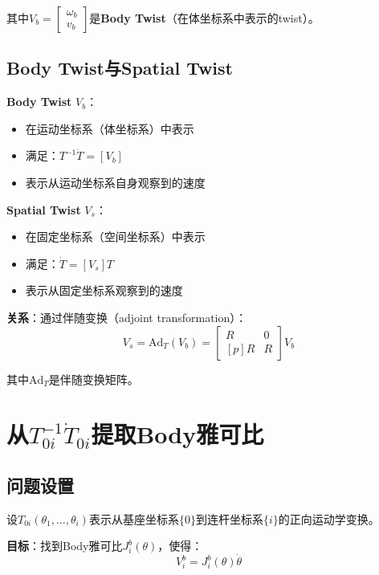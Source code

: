 \documentclass[12pt,a4paper]{article}
\begin{document}
其中$V_b = \begin{bmatrix} \omega_b \\ v_b \end{bmatrix}$是\textbf{Body Twist}（在体坐标系中表示的twist）。

\subsection{Body Twist与Spatial Twist}

\textbf{Body Twist} $V_b$：
\begin{itemize}
\item 在运动坐标系（体坐标系）中表示
\item 满足：$T^{-1} \dot{T} = [V_b]$
\item 表示从运动坐标系自身观察到的速度
\end{itemize}

\textbf{Spatial Twist} $V_s$：
\begin{itemize}
\item 在固定坐标系（空间坐标系）中表示
\item 满足：$\dot{T} = [V_s] T$
\item 表示从固定坐标系观察到的速度
\end{itemize}

\textbf{关系}：通过伴随变换（adjoint transformation）：
\begin{equation}
V_s = \text{Ad}_T(V_b) = \begin{bmatrix} R & 0 \\ [p]R & R \end{bmatrix} V_b
\end{equation}

其中$\text{Ad}_T$是伴随变换矩阵。

\section{从$T_{0i}^{-1}\dot{T}_{0i}$提取Body雅可比}

\subsection{问题设置}

设$T_{0i}(\theta_1, \ldots, \theta_i)$表示从基座坐标系$\{0\}$到连杆坐标系$\{i\}$的正向运动学变换。

\textbf{目标}：找到Body雅可比$J_i^b(\theta)$，使得：
\begin{equation}
V_i^b = J_i^b(\theta) \dot{\theta}
\label{eq:body_jacobian}
\end{equation}
\end{document}
